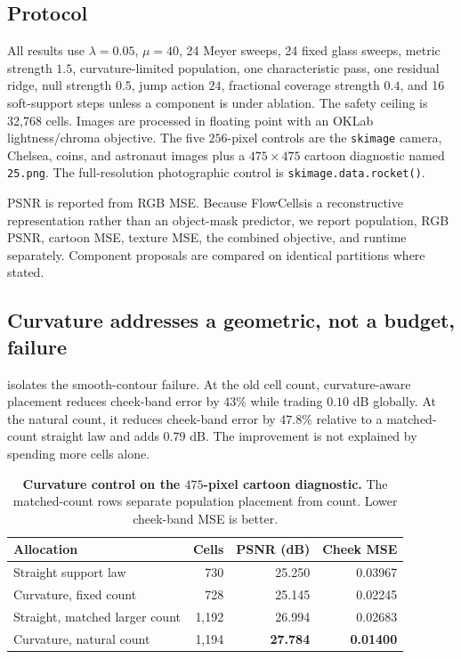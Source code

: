 \documentclass[11pt,letterpaper]{article}
\newcommand{\method}{FlowCells}
\begin{document}
\subsection{Protocol}

All results use \(\lambda=0.05\), \(\mu=40\), 24 Meyer sweeps, 24 fixed glass sweeps,
metric strength \(1.5\), curvature-limited population, one characteristic pass, one
residual ridge, null strength \(0.5\), jump action \(24\), fractional coverage strength
\(0.4\), and 16 soft-support steps unless a component is under ablation. The safety
ceiling is 32,768 cells. Images are processed in floating point with an OKLab
lightness/chroma objective. The five \(256\)-pixel controls are the
\texttt{skimage} camera, Chelsea, coins, and astronaut images plus a \(475\times475\)
cartoon diagnostic named \texttt{25.png}. The full-resolution photographic control is
\texttt{skimage.data.rocket()}.

PSNR is reported from RGB MSE. Because \method is a reconstructive representation
rather than an object-mask predictor, we report population, RGB PSNR, cartoon MSE,
texture MSE, the combined objective, and runtime separately. Component proposals are
compared on identical partitions where stated.

\subsection{Curvature addresses a geometric, not a budget, failure}

 isolates the smooth-contour failure. At the old cell count,
curvature-aware placement reduces cheek-band error by \(43\%\) while trading
\(0.10\) dB globally. At the natural count, it reduces cheek-band error by \(47.8\%\)
relative to a matched-count straight law and adds \(0.79\) dB. The improvement is not
explained by spending more cells alone.

\begin{table}[t]
\centering
\caption{\textbf{Curvature control on the \(475\)-pixel cartoon diagnostic.}
The matched-count rows separate population placement from count. Lower cheek-band MSE
is better.}
\label{tab:curvature}
\begin{tabular}{lrrr}
\toprule
Allocation & Cells & PSNR (dB) & Cheek MSE\\
\midrule
Straight support law & 730 & 25.250 & 0.03967\\
Curvature, fixed count & 728 & 25.145 & 0.02245\\
Straight, matched larger count & 1,192 & 26.994 & 0.02683\\
Curvature, natural count & 1,194 & \textbf{27.784} & \textbf{0.01400}\\
\bottomrule
\end{tabular}
\end{table}
\end{document}
